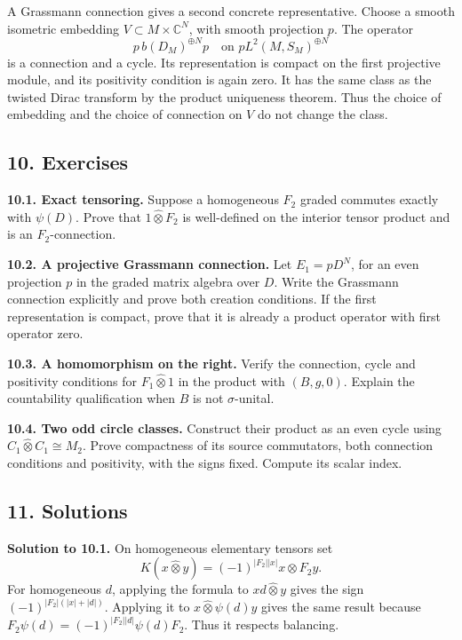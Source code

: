 \documentclass[
  11pt,
]{article}
\begin{document}
A Grassmann connection gives a second concrete representative. Choose a
smooth isometric embedding \(V\subset M\times\mathbb C^N\), with smooth
projection \(p\). The operator \[
p\,b(D_M)^{\oplus N}p
\quad\text{on }pL^2(M,S_M)^{\oplus N}
\tag{9.7}
\] is a connection and a cycle. Its representation is compact on the
first projective module, and its positivity condition is again zero. It
has the same class as the twisted Dirac transform by the product
uniqueness theorem. Thus the choice of embedding and the choice of
connection on \(V\) do not change the class.

\subsection{10. Exercises}\label{exercises}

\textbf{10.1. Exact tensoring.} Suppose a homogeneous \(F_2\) graded
commutes exactly with \(\psi(D)\). Prove that \(1\widehat\otimes F_2\)
is well-defined on the interior tensor product and is an
\(F_2\)-connection.

\textbf{10.2. A projective Grassmann connection.} Let \(E_1=pD^N\), for
an even projection \(p\) in the graded matrix algebra over \(D\). Write
the Grassmann connection explicitly and prove both creation conditions.
If the first representation is compact, prove that it is already a
product operator with first operator zero.

\textbf{10.3. A homomorphism on the right.} Verify the connection, cycle
and positivity conditions for \(F_1\widehat\otimes1\) in the product
with \((B,g,0)\). Explain the countability qualification when \(B\) is
not \(\sigma\)-unital.

\textbf{10.4. Two odd circle classes.} Construct their product as an
even cycle using \(C_1\widehat\otimes C_1\cong M_2\). Prove compactness
of its source commutators, both connection conditions and positivity,
with the signs fixed. Compute its scalar index.

\subsection{11. Solutions}\label{solutions}

\textbf{Solution to 10.1.} On homogeneous elementary tensors set \[
K(x\widehat\otimes y)=(-1)^{|F_2||x|}
x\widehat\otimes F_2y.
\] For homogeneous \(d\), applying the formula to
\(xd\widehat\otimes y\) gives the sign \((-1)^{|F_2|(|x|+|d|)}\).
Applying it to \(x\widehat\otimes\psi(d)y\) gives the same result
because \(F_2\psi(d)=(-1)^{|F_2||d|}\psi(d)F_2\). Thus it respects
balancing.
\end{document}
